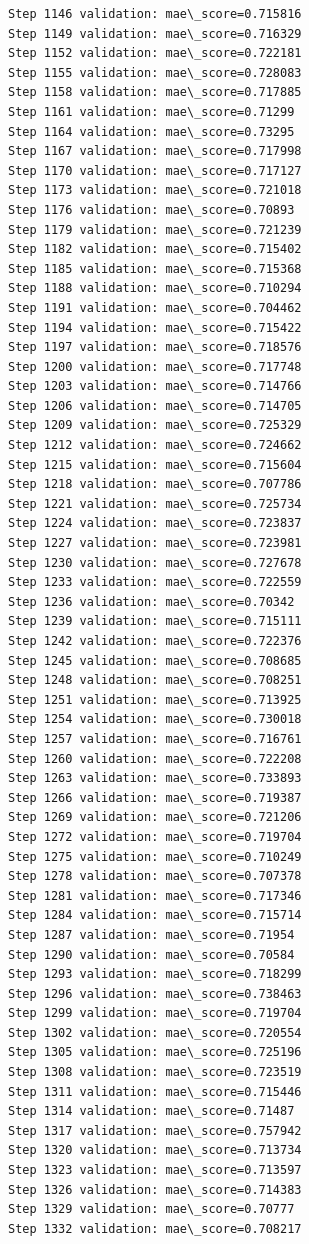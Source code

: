 \documentclass[11pt]{article}
\begin{document}
\begin{Verbatim}[commandchars=\\\{\}]
Step 1146 validation: mae\_score=0.715816
Step 1149 validation: mae\_score=0.716329
Step 1152 validation: mae\_score=0.722181
Step 1155 validation: mae\_score=0.728083
Step 1158 validation: mae\_score=0.717885
Step 1161 validation: mae\_score=0.71299
Step 1164 validation: mae\_score=0.73295
Step 1167 validation: mae\_score=0.717998
Step 1170 validation: mae\_score=0.717127
Step 1173 validation: mae\_score=0.721018
Step 1176 validation: mae\_score=0.70893
Step 1179 validation: mae\_score=0.721239
Step 1182 validation: mae\_score=0.715402
Step 1185 validation: mae\_score=0.715368
Step 1188 validation: mae\_score=0.710294
Step 1191 validation: mae\_score=0.704462
Step 1194 validation: mae\_score=0.715422
Step 1197 validation: mae\_score=0.718576
Step 1200 validation: mae\_score=0.717748
Step 1203 validation: mae\_score=0.714766
Step 1206 validation: mae\_score=0.714705
Step 1209 validation: mae\_score=0.725329
Step 1212 validation: mae\_score=0.724662
Step 1215 validation: mae\_score=0.715604
Step 1218 validation: mae\_score=0.707786
Step 1221 validation: mae\_score=0.725734
Step 1224 validation: mae\_score=0.723837
Step 1227 validation: mae\_score=0.723981
Step 1230 validation: mae\_score=0.727678
Step 1233 validation: mae\_score=0.722559
Step 1236 validation: mae\_score=0.70342
Step 1239 validation: mae\_score=0.715111
Step 1242 validation: mae\_score=0.722376
Step 1245 validation: mae\_score=0.708685
Step 1248 validation: mae\_score=0.708251
Step 1251 validation: mae\_score=0.713925
Step 1254 validation: mae\_score=0.730018
Step 1257 validation: mae\_score=0.716761
Step 1260 validation: mae\_score=0.722208
Step 1263 validation: mae\_score=0.733893
Step 1266 validation: mae\_score=0.719387
Step 1269 validation: mae\_score=0.721206
Step 1272 validation: mae\_score=0.719704
Step 1275 validation: mae\_score=0.710249
Step 1278 validation: mae\_score=0.707378
Step 1281 validation: mae\_score=0.717346
Step 1284 validation: mae\_score=0.715714
Step 1287 validation: mae\_score=0.71954
Step 1290 validation: mae\_score=0.70584
Step 1293 validation: mae\_score=0.718299
Step 1296 validation: mae\_score=0.738463
Step 1299 validation: mae\_score=0.719704
Step 1302 validation: mae\_score=0.720554
Step 1305 validation: mae\_score=0.725196
Step 1308 validation: mae\_score=0.723519
Step 1311 validation: mae\_score=0.715446
Step 1314 validation: mae\_score=0.71487
Step 1317 validation: mae\_score=0.757942
Step 1320 validation: mae\_score=0.713734
Step 1323 validation: mae\_score=0.713597
Step 1326 validation: mae\_score=0.714383
Step 1329 validation: mae\_score=0.70777
Step 1332 validation: mae\_score=0.708217

\end{Verbatim}
\end{document}
